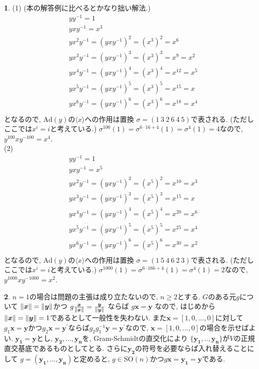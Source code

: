 \documentclass{amsart}
\theoremstyle{definition}
\newtheorem{ans}{}
\numberwithin{ans}{subsection}
\newcommand{\SO}[1]{\mathrm{SO}(#1)}
\newcommand{\Ad}[1]{\mathrm{Ad}(#1)}
\DeclarePairedDelimiter{\norm}{\lVert}{\rVert}
\begin{document}
\begin{ans}
  (1) (本の解答例に比べるとかなり拙い解法.)
  \begin{align*}
    &yy^{-1} = 1\\
    &yxy^{-1} = x^3\\
    &yx^2y^{-1} = (yxy^{-1})^2 = (x^3)^2 = x^6\\
    &yx^3y^{-1} = (yxy^{-1})^3 = (x^3)^3 = x^9 = x^2\\
    &yx^4y^{-1} = (yxy^{-1})^4 = (x^3)^4 = x^{12} = x^5\\
    &yx^5y^{-1} = (yxy^{-1})^5 = (x^3)^5 = x^{15} = x\\
    &yx^6y^{-1} = (yxy^{-1})^6 = (x^3)^6 = x^{18} = x^4\\
  \end{align*}
  となるので, $\Ad{y}$の$\langle x \rangle$への作用は置換
  $\sigma = (1\ 3\ 2\ 6\ 4\ 5)$で表される. (ただしここでは$x^i = i$と考えている.)
  $\sigma^{100}(1) = \sigma^{6 \cdot 16 + 4}(1) = \sigma^{4}(1) = 4$なので, $y^{100}xy^{-100} = x^4$.\\
  (2)
  \begin{align*}
    &yy^{-1} = 1\\
    &yxy^{-1} = x^5\\
    &yx^2y^{-1} = (yxy^{-1})^2 = (x^5)^2 = x^{10} = x^3\\
    &yx^3y^{-1} = (yxy^{-1})^3 = (x^5)^3 = x^{15} = x\\
    &yx^4y^{-1} = (yxy^{-1})^4 = (x^5)^4 = x^{20} = x^6\\
    &yx^5y^{-1} = (yxy^{-1})^5 = (x^5)^5 = x^{25} = x^4\\
    &yx^6y^{-1} = (yxy^{-1})^6 = (x^5)^6 = x^{30} = x^2\\
  \end{align*}
  となるので, $\Ad{y}$の$\langle x \rangle$への作用は置換
  $\sigma = (1\ 5\ 4\ 6\ 2\ 3)$で表される. (ただしここでは$x^i = i$と考えている.)
  $\sigma^{1000}(1) = \sigma^{6 \cdot 166 + 4}(1) = \sigma^{4}(1) = 2$なので, $y^{1000}xy^{-1000} = x^2$.\\
\end{ans}

\begin{ans}
  $n = 1$の場合は問題の主張は成り立たないので, $n \ge 2$とする.
  $G$のある元$g$について
  $\norm{\bm{x}} = \norm{\bm{y}}$かつ
  $g\frac{\bm{x}}{\norm{\bm{x}}} = \frac{\bm{y}}{\norm{\bm{y}}}$
  ならば
  $g\bm{x} = \bm{y}$
  なので, はじめから$\norm{\bm{x}} = \norm{\bm{y}} = 1$であるとして一般性を失わない.
  また$\bm{x} = [1, 0,..., 0]$に対して$g_1\bm{x} = \bm{y}$かつ$g_2\bm{x} = \bm{y}^\prime$ならば$g_2g_1^{-1}\bm{y} = \bm{y}^\prime$なので,
  $\bm{x} = [1, 0,..., 0]$の場合を示せばよい.
  $\bm{y_1} = \bm{y}$とし, $\bm{y_2},..., \bm{y_n}$を, Gram-Schmidtの直交化により
  $\{\bm{y_1},.., \bm{y_n}\}$が$V$の正規直交基底であるものとしてとる.
  さらに$\bm{y_2}$の符号を必要ならば入れ替えることにして
  $g = (\bm{y_1},..., \bm{y_n})$と定めると, $g \in \SO{n}$かつ$g\bm{x} = \bm{y_1} = \bm{y}$である.
\end{ans}
\end{document}
